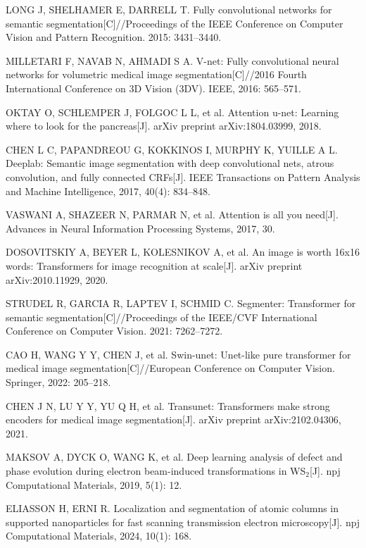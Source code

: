 LONG J, SHELHAMER E, DARRELL T. Fully convolutional networks for semantic segmentation[C]//Proceedings of the IEEE Conference on Computer Vision and Pattern Recognition. 2015: 3431--3440.

MILLETARI F, NAVAB N, AHMADI S A. V-net: Fully convolutional neural networks for volumetric medical image segmentation[C]//2016 Fourth International Conference on 3D Vision (3DV). IEEE, 2016: 565--571.

OKTAY O, SCHLEMPER J, FOLGOC L L, et al. Attention u-net: Learning where to look for the pancreas[J]. arXiv preprint arXiv:1804.03999, 2018.

CHEN L C, PAPANDREOU G, KOKKINOS I, MURPHY K, YUILLE A L. Deeplab: Semantic image segmentation with deep convolutional nets, atrous convolution, and fully connected CRFs[J]. IEEE Transactions on Pattern Analysis and Machine Intelligence, 2017, 40(4): 834--848.

VASWANI A, SHAZEER N, PARMAR N, et al. Attention is all you need[J]. Advances in Neural Information Processing Systems, 2017, 30.

DOSOVITSKIY A, BEYER L, KOLESNIKOV A, et al. An image is worth 16x16 words: Transformers for image recognition at scale[J]. arXiv preprint arXiv:2010.11929, 2020.

STRUDEL R, GARCIA R, LAPTEV I, SCHMID C. Segmenter: Transformer for semantic segmentation[C]//Proceedings of the IEEE/CVF International Conference on Computer Vision. 2021: 7262--7272.

CAO H, WANG Y Y, CHEN J, et al. Swin-unet: Unet-like pure transformer for medical image segmentation[C]//European Conference on Computer Vision. Springer, 2022: 205--218.

CHEN J N, LU Y Y, YU Q H, et al. Transunet: Transformers make strong encoders for medical image segmentation[J]. arXiv preprint arXiv:2102.04306, 2021.

MAKSOV A, DYCK O, WANG K, et al. Deep learning analysis of defect and phase evolution during electron beam-induced transformations in WS$_2$[J]. npj Computational Materials, 2019, 5(1): 12.

ELIASSON H, ERNI R. Localization and segmentation of atomic columns in supported nanoparticles for fast scanning transmission electron microscopy[J]. npj Computational Materials, 2024, 10(1): 168.

